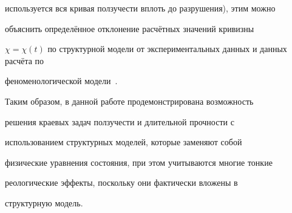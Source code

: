 используется вся кривая ползучести вплоть до разрушения), этим можно

объяснить определённое отклонение расчётных значений кривизны

$\chi=\chi(t)$ по структурной модели от экспериментальных данных и данных расчёта по

феноменологической модели~\cite{nebogina:bib12}.







Таким образом, в данной работе продемонстрирована возможность

решения краевых задач ползучести и длительной прочности с

использованием структурных моделей, которые заменяют собой

физические уравнения состояния, при этом учитываются многие тонкие

реологические эффекты, поскольку они фактически вложены в

структурную модель.







